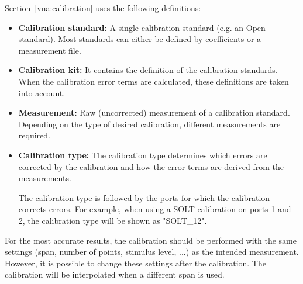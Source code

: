\documentclass[a4paper,11pt]{article}
\begin{document}
Section~\ref{vna:calibration} uses the following definitions:
\begin{itemize}
\item \textbf{Calibration standard:} A single calibration standard (e.g. an Open standard). Most standards can either be defined by coefficients or a measurement file.
\item \textbf{Calibration kit:} It contains the definition of the calibration standards. When the calibration error terms are calculated, these definitions are taken into account.
\item \textbf{Measurement:} Raw (uncorrected) measurement of a calibration standard. Depending on the type of desired calibration, different measurements are required.
\item \textbf{Calibration type:} The calibration type determines which errors are corrected by the calibration and how the error terms are derived from the measurements.

The calibration type is followed by the ports for which the calibration corrects errors. For example, when using a SOLT calibration on ports 1 and 2, the calibration type will be shown as "SOLT\_12".
\end{itemize}

For the most accurate results, the calibration should be performed with the same settings (span, number of points, stimulus level, ...) as the intended measurement. However, it is possible to change these settings after the calibration. The calibration will be interpolated when a different span is used.
\end{document}
